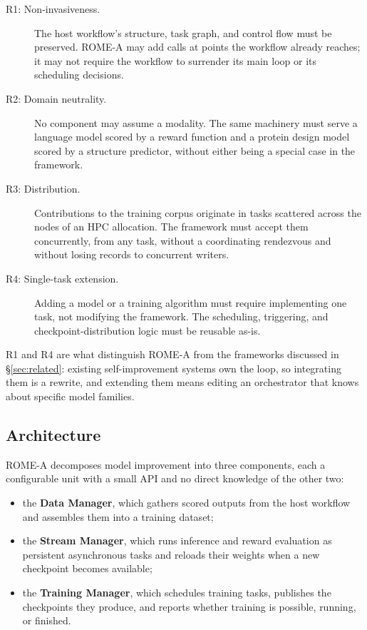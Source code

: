 \begin{description}
  \item[R1: Non-invasiveness.] The host workflow's structure, task graph, and
    control flow must be preserved. ROME-A may add calls at points the workflow
    already reaches; it may not require the workflow to surrender its main loop
    or its scheduling decisions.
  \item[R2: Domain neutrality.] No component may assume a modality. The same
    machinery must serve a language model scored by a reward function and a
    protein design model scored by a structure predictor, without either being
    a special case in the framework.
  \item[R3: Distribution.] Contributions to the training corpus originate in
    tasks scattered across the nodes of an HPC allocation. The framework must
    accept them concurrently, from any task, without a coordinating rendezvous
    and without losing records to concurrent writers.
  \item[R4: Single-task extension.] Adding a model or a training algorithm must
    require implementing one task, not modifying the framework. The scheduling,
    triggering, and checkpoint-distribution logic must be reusable as-is.
\end{description}

R1 and R4 are what distinguish ROME-A from the frameworks discussed in
\S\ref{sec:related}: existing self-improvement systems own the loop, so
integrating them is a rewrite, and extending them means editing an orchestrator
that knows about specific model families.

\subsection{Architecture}
\label{sec:design:architecture}

ROME-A decomposes model improvement into three components, each a configurable
unit with a small API and no direct knowledge of the other two:

\begin{itemize}
  \item the \textbf{Data Manager}, which gathers scored outputs from the host
    workflow and assembles them into a training dataset;
  \item the \textbf{Stream Manager}, which runs inference and reward evaluation
    as persistent asynchronous tasks and reloads their weights when a new
    checkpoint becomes available;
  \item the \textbf{Training Manager}, which schedules training tasks, publishes
    the checkpoints they produce, and reports whether training is possible,
    running, or finished.
\end{itemize}

